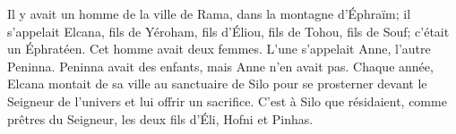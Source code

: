 Il y avait un homme de la ville de Rama, dans la montagne d’Éphraïm;
	il s’appelait Elcana, fils de Yéroham, fils d’Éliou, fils de Tohou, fils de Souf;
	c’était un Éphratéen.
Cet homme avait deux femmes.
	L’une s’appelait Anne, l’autre Peninna.
	Peninna avait des enfants, mais Anne n’en avait pas.
Chaque année, Elcana montait de sa ville au sanctuaire de Silo
	pour se prosterner devant le Seigneur de l’univers et lui offrir un sacrifice.
C’est à Silo que résidaient, comme prêtres du Seigneur,
	les deux fils d’Éli, Hofni et Pinhas.
